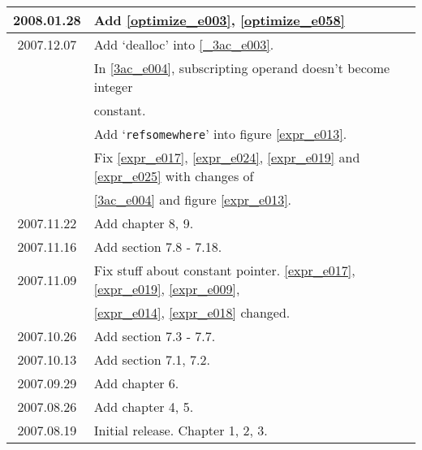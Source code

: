 \begin{tabular}{|c|l|}
2008.01.28 & Add \ref{optimize_e003}, \ref{optimize_e058} \\ \hline
2007.12.07 & Add `dealloc' into \ref{_3ac_e003}. \\
           & In \ref{3ac_e004}, subscripting operand doesn't become integer \\
           & constant. \\
           & Add `{\tt{refsomewhere}}' into figure \ref{expr_e013}. \\
           & Fix \ref{expr_e017}, \ref{expr_e024}, \ref{expr_e019}
             and \ref{expr_e025} with changes of \\
           &  \ref{3ac_e004} and figure \ref{expr_e013}. \\ \hline
2007.11.22 & Add chapter 8, 9. \\ \hline
2007.11.16 & Add section 7.8 - 7.18. \\ \hline
2007.11.09 & Fix stuff about constant pointer. \ref{expr_e017},
             \ref{expr_e019}, \ref{expr_e009}, \\
           & \ref{expr_e014}, \ref{expr_e018} changed. \\ \hline
2007.10.26 & Add section 7.3 - 7.7. \\ \hline
2007.10.13 & Add section 7.1, 7.2. \\ \hline
2007.09.29 & Add chapter 6. \\ \hline
2007.08.26 & Add chapter 4, 5. \\ \hline
2007.08.19 & Initial release. Chapter 1, 2, 3. \\ \hline
\end{tabular}
